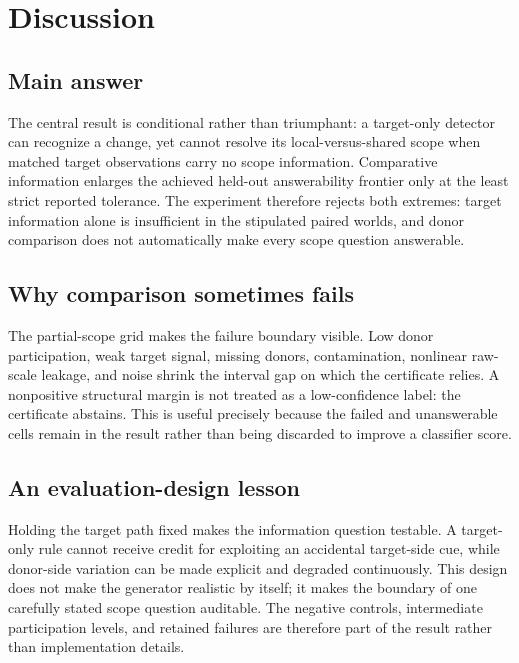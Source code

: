 \section{Discussion}
\suppressfloats[t]
\label{sec:discussion}

\subsection{Main answer}

The central result is conditional rather than triumphant: a target-only
detector can recognize a change, yet cannot resolve its local-versus-shared
scope when matched target observations carry no scope information. Comparative
information enlarges the achieved held-out answerability frontier only at the
least strict reported tolerance. The experiment therefore rejects both
extremes: target information alone is insufficient in the stipulated paired
worlds, and donor comparison does not automatically make every scope question
answerable.

\subsection{Why comparison sometimes fails}

The partial-scope grid makes the failure boundary visible. Low donor
participation, weak target signal, missing donors, contamination, nonlinear
raw-scale leakage, and noise shrink the interval gap on which the certificate
relies. A nonpositive structural margin is not treated as a low-confidence
label: the certificate abstains. This is useful precisely because the failed
and unanswerable cells remain in the result rather than being discarded to
improve a classifier score.

\subsection{An evaluation-design lesson}

Holding the target path fixed makes the information question testable. A
target-only rule cannot receive credit for exploiting an accidental target-side
cue, while donor-side variation can be made explicit and degraded
continuously. This design does not make the generator realistic by itself; it
makes the boundary of one carefully stated scope question auditable. The
negative controls, intermediate participation levels, and retained failures are
therefore part of the result rather than implementation details.


